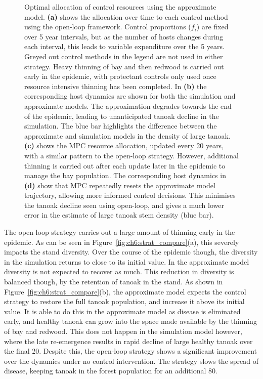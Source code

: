 \begin{figure}
    \begin{center}
        \caption[Open-loop and MPC optimal control strategies]{Optimal allocation of control resources using the approximate model. \textbf{(a)} shows the allocation over time to each control method using the open-loop framework. Control proportions ($f_i$) are fixed over 5 year intervals, but as the number of hosts changes during each interval, this leads to variable expenditure over the 5 years. Greyed out control methods in the legend are not used in either strategy. Heavy thinning of bay and then redwood is carried out early in the epidemic, with protectant controls only used once resource intensive thinning has been completed. In \textbf{(b)} the corresponding host dynamics are shown for both the simulation and approximate models. The approximation degrades towards the end of the epidemic, leading to unanticipated tanoak decline in the simulation. The blue bar highlights the difference between the approximate and simulation models in the density of large tanoak. \textbf{(c)} shows the MPC resource allocation, updated every 20 years, with a similar pattern to the open-loop strategy. However, additional thinning is carried out after each update later in the epidemic to manage the bay population. The corresponding host dynamics in \textbf{(d)} show that MPC repeatedly resets the approximate model trajectory, allowing more informed control decisions. This minimises the tanoak decline seen using open-loop, and gives a much lower error in the estimate of large tanoak stem density (blue bar).\label{fig:ch6:strats}}
    \end{center}
\end{figure}

The open-loop strategy carries out a large amount of thinning early in the epidemic. As can be seen in Figure~\ref{fig:ch6:strat_compare}(a), this severely impacts the stand diversity. Over the course of the epidemic though, the diversity in the simulation returns to close to its initial value. In the approximate model diversity is not expected to recover as much. This reduction in diversity is balanced though, by the retention of tanoak in the stand. As shown in Figure~\ref{fig:ch6:strat_compare}(b), the approximate model expects the control strategy to restore the full tanoak population, and increase it above its initial value. It is able to do this in the approximate model as disease is eliminated early, and healthy tanoak can grow into the space made available by the thinning of bay and redwood. This does not happen in the simulation model however, where the late re-emergence results in rapid decline of large healthy tanoak over the final \SI{20}{\years}. Despite this, the open-loop strategy shows a significant improvement over the dynamics under no control intervention. The strategy slows the spread of disease, keeping tanoak in the forest population for an additional \SI{80}{\years}.

